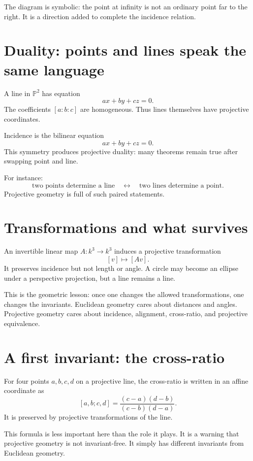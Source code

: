 The diagram is symbolic: the point at infinity is not an ordinary point far to the right. It is a direction added to complete the incidence relation.

\section{Duality: points and lines speak the same language}

A line in \(\mathbb P^2\) has equation
\[
  ax+by+cz=0.
\]
The coefficients \([a:b:c]\) are homogeneous. Thus lines themselves have projective coordinates.

Incidence is the bilinear equation
\[
  ax+by+cz=0.
\]
This symmetry produces projective duality: many theorems remain true after swapping point and line.

For instance:
\[
  \text{two points determine a line}
  \quad\longleftrightarrow\quad
  \text{two lines determine a point}.
\]
Projective geometry is full of such paired statements.

\section{Transformations and what survives}

An invertible linear map \(A:k^3\to k^3\) induces a projective transformation
\[
  [v]\longmapsto[Av].
\]
It preserves incidence but not length or angle. A circle may become an ellipse under a perspective projection, but a line remains a line.

This is the geometric lesson: once one changes the allowed transformations, one changes the invariants. Euclidean geometry cares about distances and angles. Projective geometry cares about incidence, alignment, cross-ratio, and projective equivalence.

\section{A first invariant: the cross-ratio}

For four points \(a,b,c,d\) on a projective line, the cross-ratio is written in an affine coordinate as
\[
  [a,b;c,d]
  =\frac{(c-a)(d-b)}{(c-b)(d-a)}.
\]
It is preserved by projective transformations of the line.

This formula is less important here than the role it plays. It is a warning that projective geometry is not invariant-free. It simply has different invariants from Euclidean geometry.

